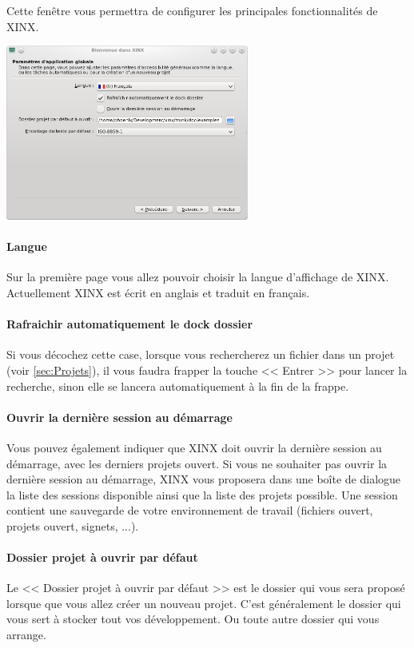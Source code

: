 \documentclass[a4paper,10pt,twoside]{book}
\begin{document}
Cette fenêtre vous permettra de configurer les principales fonctionnalités de XINX. 

\begin{center}
 \includegraphics[width=0.60\textwidth]{./firstinstall2.png}
\end{center}

\paragraph{Langue} Sur la première page vous allez pouvoir choisir la langue d'affichage de XINX. Actuellement XINX est écrit en anglais et traduit en français. 

\paragraph{Rafraichir automatiquement le dock dossier} Si vous décochez cette case, lorsque vous rechercherez un fichier dans un projet (voir \ref{sec:Projets}), il vous faudra frapper la touche << Entrer >> pour lancer la recherche, sinon elle se lancera automatiquement à la fin de la frappe.

\paragraph{Ouvrir la dernière session au démarrage} Vous pouvez également indiquer que XINX doit ouvrir la dernière session au démarrage, avec les derniers projets ouvert. Si vous ne souhaiter pas ouvrir la dernière session au démarrage, XINX vous proposera dans une boîte de dialogue la liste des sessions disponible ainsi que la liste des projets possible. Une session contient une sauvegarde de votre environnement de travail (fichiers ouvert, projets ouvert, signets, ...).

\paragraph{Dossier projet à ouvrir par défaut} Le << Dossier projet à ouvrir par défaut >> est le dossier qui vous sera proposé lorsque que vous allez créer un nouveau projet. C'est généralement le dossier qui vous sert à stocker tout vos développement. Ou toute autre dossier qui vous arrange.
\end{document}
